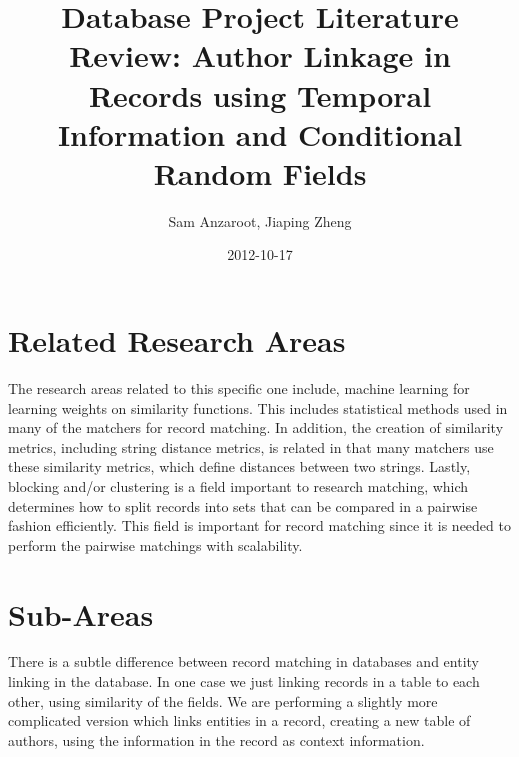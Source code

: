 \documentclass[]{article}
\title{Database Project Literature Review: Author Linkage in Records using Temporal Information and Conditional Random Fields}
\author{Sam Anzaroot, Jiaping Zheng}
\date{2012-10-17}
\begin{document}
\ifpdf
{}
\else
{}
\fi

\maketitle

\section{Related Research Areas} %
\label{sec:related_research_areas}
The research areas related to this specific one include, machine learning for learning weights on similarity functions. This includes statistical methods used in many of the matchers for record matching. In addition, the creation of similarity metrics, including string distance metrics, is related in that many matchers use these similarity metrics, which define distances between two strings. Lastly, blocking and/or clustering is a field important to research matching, which determines how to split records into sets that can be compared in a pairwise fashion efficiently. This field is important for record matching since it is needed to perform the pairwise matchings with scalability. 

\section{Sub-Areas} %
\label{sec:sub_areas}
There is a subtle difference between record matching in databases and entity linking in the database. In one case we just linking records in a table to each other, using similarity of the fields. We are performing a slightly more complicated version which links entities in a record, creating a new table of authors, using the information in the record as context information.
\end{document}
